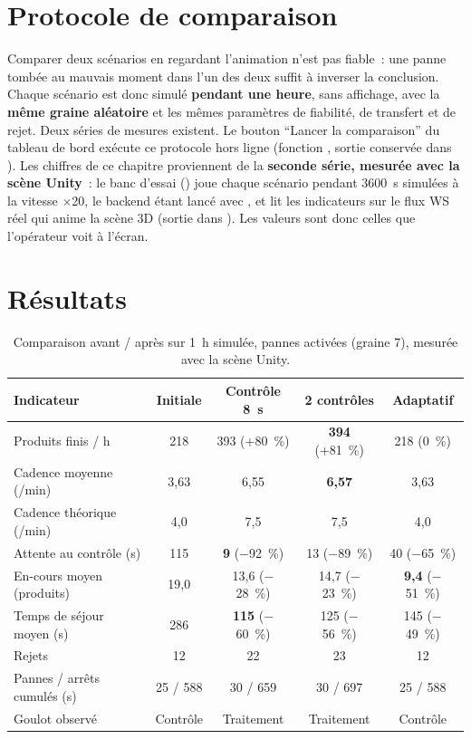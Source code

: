 \section{Protocole de comparaison}

Comparer deux scénarios en regardant l'animation n'est pas fiable~: une panne tombée au mauvais moment dans l'un des deux suffit à inverser la conclusion. Chaque scénario est donc simulé \textbf{pendant une heure}, sans affichage, avec la \textbf{même graine aléatoire} et les mêmes paramètres de fiabilité, de transfert et de rejet. Deux séries de mesures existent. Le bouton \enquote{Lancer la comparaison} du tableau de bord exécute ce protocole hors ligne (fonction , sortie conservée dans ). Les chiffres de ce chapitre proviennent de la \textbf{seconde série, mesurée avec la scène Unity}~: le banc d'essai () joue chaque scénario pendant 3600~s simulées à la vitesse $\times$20, le backend étant lancé avec , et lit les indicateurs sur le flux \ac{WS} réel qui anime la scène \ac{3D} (sortie dans ). Les valeurs sont donc celles que l'opérateur voit à l'écran.

\section{Résultats}

\begin{table}[H]
\centering
\caption{Comparaison avant / après sur 1~h simulée, pannes activées (graine 7), mesurée avec la scène Unity.}
\label{tab:resultats}
\small
\begin{tabularx}{\textwidth}{@{}X cccc@{}}
\toprule
\textbf{Indicateur} & \textbf{Initiale} & \textbf{Contrôle 8~s} & \textbf{2 contrôles} & \textbf{Adaptatif} \\
\midrule
Produits finis / h & 218 & 393 (+80~\%) & \textbf{394} (+81~\%) & 218 (0~\%) \\
Cadence moyenne (/min) & 3,63 & 6,55 & \textbf{6,57} & 3,63 \\
Cadence théorique (/min) & 4,0 & 7,5 & 7,5 & 4,0 \\
Attente au contrôle (s) & 115 & \textbf{9} ($-$92~\%) & 13 ($-$89~\%) & 40 ($-$65~\%) \\
En-cours moyen (produits) & 19,0 & 13,6 ($-$28~\%) & 14,7 ($-$23~\%) & \textbf{9,4} ($-$51~\%) \\
Temps de séjour moyen (s) & 286 & \textbf{115} ($-$60~\%) & 125 ($-$56~\%) & 145 ($-$49~\%) \\
Rejets & 12 & 22 & 23 & 12 \\
Pannes / arrêts cumulés (s) & 25 / 588 & 30 / 659 & 30 / 697 & 25 / 588 \\
Goulot observé & Contrôle & Traitement & Traitement & Contrôle \\
\bottomrule
\end{tabularx}
\end{table}

